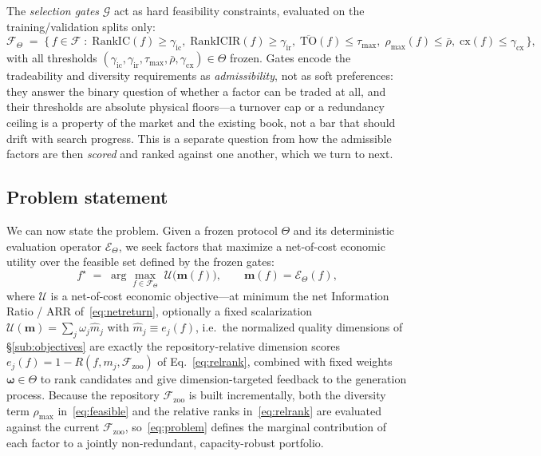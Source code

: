 \documentclass[11pt]{article}
\newcommand{\Fspace}{\mathcal{F}}
\newcommand{\gates}{\mathcal{G}}
\newcommand{\proto}{\Theta}
\newcommand{\evalop}{\mathcal{E}}
\newcommand{\feasible}{\Fspace_{\proto}}
\newcommand{\zoo}{\Fspace_{\mathrm{zoo}}}
\begin{document}
The \emph{selection gates} $\gates$ act as hard feasibility constraints, evaluated on
the training/validation splits only:
\begin{equation}
  \feasible \;=\; \Big\{\, f\in\Fspace \;:\;
  \mathrm{RankIC}(f)\ge \gamma_{\mathrm{ic}},\;
  \mathrm{RankICIR}(f)\ge \gamma_{\mathrm{ir}},\;
  \overline{\mathrm{TO}}(f)\le \tau_{\max},\;
  \rho_{\max}(f)\le \bar{\rho},\;
  \mathrm{cx}(f)\le \gamma_{\mathrm{cx}}
  \,\Big\},
  \label{eq:feasible}
\end{equation}
with all thresholds $(\gamma_{\mathrm{ic}},\gamma_{\mathrm{ir}},\tau_{\max},\bar{\rho},
\gamma_{\mathrm{cx}})\in\proto$ frozen. Gates encode the tradeability and
diversity requirements as \emph{admissibility}, not as soft preferences: they answer the
binary question of whether a factor can be traded at all, and their thresholds are
absolute physical floors---a turnover cap or a redundancy ceiling is a property of the
market and the existing book, not a bar that should drift with search progress. This is a
separate question from how the admissible factors are then \emph{scored} and ranked
against one another, which we turn to next.

\subsection{Problem statement}
\label{sub:statement}

We can now state the problem. Given a frozen protocol $\proto$ and its deterministic
evaluation operator $\evalop_\proto$, we seek factors that maximize a net-of-cost
economic utility over the feasible set defined by the frozen gates:
\begin{equation}
  \boxed{\;
  f^\star \;=\; \arg\max_{f\in\feasible}\;
  \mathcal{U}\!\big(\bm{m}(f)\big),
  \qquad \bm{m}(f)=\evalop_\proto(f),
  \;}
  \label{eq:problem}
\end{equation}
where $\mathcal{U}$ is a net-of-cost economic objective---at minimum the net Information
Ratio / ARR of~\eqref{eq:netreturn}, optionally a fixed scalarization
$\mathcal{U}(\bm{m})=\sum_j \omega_j \hat{m}_j$ with $\hat{m}_j \equiv e_j(f)$, i.e.\ the
normalized quality dimensions of \S\ref{sub:objectives} are exactly the
repository-relative dimension scores $e_j(f)=1-R(f,m_j,\zoo)$ of
Eq.~\eqref{eq:relrank}, combined with fixed weights $\bm{\omega}\in\proto$ to rank
candidates and give dimension-targeted feedback to the generation process. Because
the repository $\zoo$ is built incrementally, both the diversity term $\rho_{\max}$
in~\eqref{eq:feasible} and the relative ranks in~\eqref{eq:relrank} are evaluated against
the current $\zoo$, so~\eqref{eq:problem} defines the marginal contribution of each factor
to a jointly non-redundant, capacity-robust portfolio.
\end{document}
